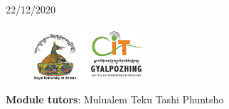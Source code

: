 \documentclass[12pt]{report}
\begin{document}
\begin{titlepage}
		\vspace{2cm}
		
		\begin{center}
			{\large 22/12/2020}		%
		\end{center}

		

	
	 
		\begin{figure}
		\centering
		\includegraphics[width=0.14\textwidth]{RUB_logo}  %
		\hspace{5cm}	
		\includegraphics[width=0.21\textwidth]{gcit_logo.png}  %
		\vspace{1cm}	
		\end{figure}
	
		
		\vfill %
		
		
		
		\large
		\textbf{Module tutors}:  \hspace{1cm} Mulualem Teku \hspace{1cm} Tashi Phuntsho
		
		
	\end{titlepage}               %
	
	

\end{document}
